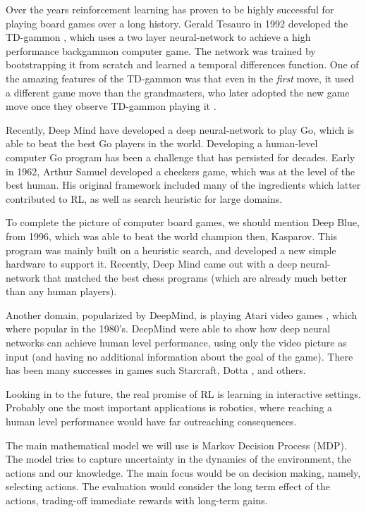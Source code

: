 Over the years reinforcement learning has proven to be highly
successful for playing board games over a long history. Gerald
Tesauro in 1992 developed the TD-gammon \cite{XX}, which uses a two layer
neural-network to achieve a high performance backgammon computer
game. The network was trained by bootstrapping it from scratch and
learned a temporal differences function. One of the amazing features
of the TD-gammon was that even in the {\em first} move, it used a
different game move than the grandmasters, who later adopted the new
game move once they observe TD-gammon playing it \cite{XX}.

Recently, Deep Mind have developed a deep neural-network
to play Go, which is able to beat the best Go players in the world.
Developing a human-level computer Go program has been a challenge
that has persisted for decades.
Early in 1962, Arthur Samuel developed a checkers game, which was at
the level of the best human. His original framework included many of
the ingredients which latter contributed to RL,
as well as search heuristic for large domains.

To complete the picture of computer board games, we should mention
Deep Blue, from 1996, which was able to beat the world champion then,
Kasparov. This program was mainly built on a heuristic search, and
developed a new simple hardware to support it. Recently, Deep Mind
came out with a deep neural-network that matched the best chess
programs (which are already much better than any human players).

Another domain, popularized by DeepMind, is playing Atari video
games \cite{XX}, which where popular in the 1980's. DeepMind were able to
show how deep neural networks can achieve human level performance,
using only the video picture as input (and having no additional
information about the goal of the game). There has been many successes in games
such Starcraft\cite{xx}, Dotta \cite{xx}, and others.

Looking in to the future, the real promise of RL
is learning in interactive settings. Probably one the most important
applications is robotics, where reaching a human level performance
would have far outreaching consequences.



\medskip
{}
%
The main mathematical model we will use is Markov Decision Process
(MDP). The model tries to capture uncertainty in the dynamics of the
environment, the actions and our knowledge. The main focus would be
on decision making, namely, selecting actions. The evaluation would
consider the long term effect of the actions, trading-off immediate
rewards with long-term gains.

